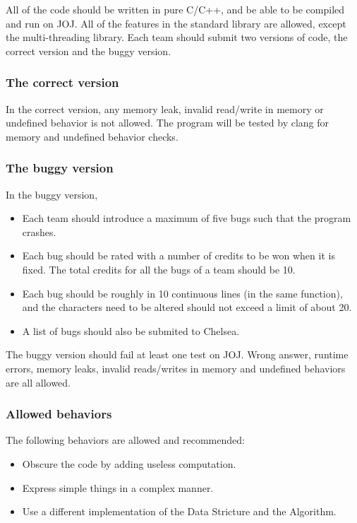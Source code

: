 \documentclass[11pt,a4paper]{article}
\begin{document}
All of the code should be written in pure C/C++, and be able to be compiled and run on JOJ. All of the features in the standard library are allowed, except the multi-threading library. Each team should submit two versions of code, the correct version and the buggy version. \medskip

\subsubsection{The correct version}

In the correct version, any memory leak, invalid read/write in memory or undefined behavior is not allowed. The program will be tested by clang for memory and undefined behavior checks.  \medskip


\subsubsection{The buggy version}

In the buggy version,

\begin{itemize}
	\item Each team should introduce a maximum of five bugs such that the program crashes.
	\item Each bug should be rated with a number of
	credits to be won when it is fixed. The total credits for all the bugs of a team should be 10.
	\item Each bug should be roughly in 10 continuous lines (in the same function), and the characters need to be altered should not exceed a limit of about 20.
	\item A list of bugs should also be submited to Chelsea.
\end{itemize}

The buggy version should fail at least one test on JOJ. Wrong answer, runtime errors, memory leaks, invalid reads/writes in memory and undefined behaviors are all allowed.

\subsubsection{Allowed behaviors}

The following behaviors are allowed and recommended:

\begin{itemize}
	\item Obscure the code by adding useless computation.
	\item Express simple things in a complex manner.
	\item Use a different implementation of the Data Stricture and the Algorithm.
\end{itemize}
\end{document}
